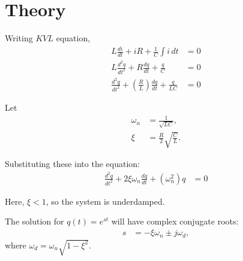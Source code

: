 \documentclass[a4paper,12pt]{article}
\begin{document}
\section{Theory}
\begin{figure}[!h]
\centering
{}%
\label{fig:my_label}
\end{figure}
Writing $KVL$ equation, 
\begin{align*}
    L \frac{di}{dt} + iR + \frac{1}{C} \int i \, dt &= 0 \\[10pt]
    L \frac{d^2q}{dt^2} + R \frac{dq}{dt} + \frac{q}{C} &= 0 \\[10pt]
    \frac{d^2q}{dt^2} + \left(\frac{R}{L}\right) \frac{dq}{dt} + \frac{q}{LC} &= 0
\end{align*}

Let 
\begin{align*}
    \omega_n &= \frac{1}{\sqrt{LC}}, \\ 
    \xi &= \frac{R}{2} \sqrt{\frac{C}{L}}.
\end{align*}

Substituting these into the equation:
\begin{align*}
    \frac{d^2q}{dt^2} + 2\xi \omega_n \frac{dq}{dt} + (\omega_n^2) q &= 0
\end{align*}

Here, $\xi < 1$, so the system is underdamped.

The solution for $q(t) = e^{st}$ will have complex conjugate roots:
\begin{align*}
    s &= -\xi \omega_n \pm j\omega_d,
\end{align*}
where $\omega_d = \omega_n \sqrt{1 - \xi^2}$.
\end{document}
